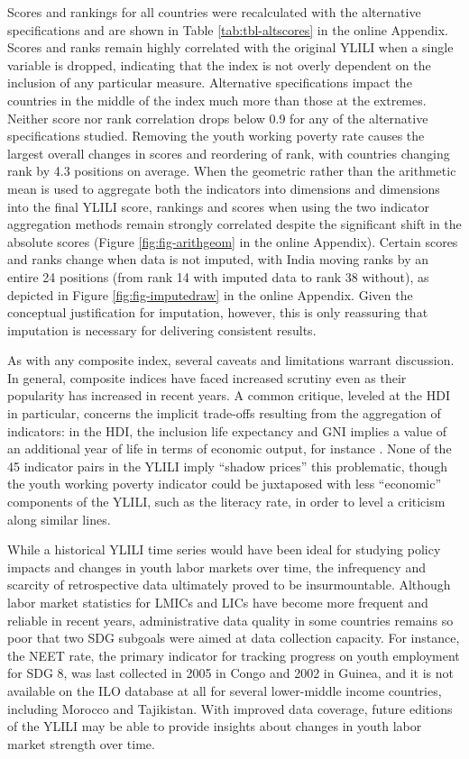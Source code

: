 \documentclass[
  a4paper, twoside, 12pt]{book}
\begin{document}


Scores and rankings for all countries were recalculated with the alternative specifications and are shown in Table \ref{tab:tbl-altscores} in the online Appendix. Scores and ranks remain highly correlated with the original YLILI when a single variable is dropped, indicating that the index is not overly dependent on the inclusion of any particular measure. Alternative specifications impact the countries in the middle of the index much more than those at the extremes. Neither score nor rank correlation drops below 0.9 for any of the alternative specifications studied. Removing the youth working poverty rate causes the largest overall changes in scores and reordering of rank, with countries changing rank by 4.3 positions on average. When the geometric rather than the arithmetic mean is used to aggregate both the indicators into dimensions and dimensions into the final YLILI score, rankings and scores when using the two indicator aggregation methods remain strongly correlated despite the significant shift in the absolute scores (Figure \ref{fig:fig-arithgeom} in the online Appendix). Certain scores and ranks change when data is not imputed, with India moving ranks by an entire 24 positions (from rank 14 with imputed data to rank 38 without), as depicted in Figure \ref{fig:fig-imputedraw} in the online Appendix. Given the conceptual justification for imputation, however, this is only reassuring that imputation is necessary for delivering consistent results.

As with any composite index, several caveats and limitations warrant discussion. In general, composite indices have faced increased scrutiny even as their popularity has increased in recent years. A common critique, leveled at the HDI in particular, concerns the implicit trade-offs resulting from the aggregation of indicators: in the HDI, the inclusion life expectancy and GNI implies a value of an additional year of life in terms of economic output, for instance \autocite{ravallion2012}. None of the 45 indicator pairs in the YLILI imply ``shadow prices'' this problematic, though the youth working poverty indicator could be juxtaposed with less ``economic'' components of the YLILI, such as the literacy rate, in order to level a criticism along similar lines.

While a historical YLILI time series would have been ideal for studying policy impacts and changes in youth labor markets over time, the infrequency and scarcity of retrospective data ultimately proved to be insurmountable. Although labor market statistics for LMICs and LICs have become more frequent and reliable in recent years, administrative data quality in some countries remains so poor that two SDG subgoals were aimed at data collection capacity. For instance, the NEET rate, the primary indicator for tracking progress on youth employment for SDG 8, was last collected in 2005 in Congo and 2002 in Guinea, and it is not available on the ILO database at all for several lower-middle income countries, including Morocco and Tajikistan. With improved data coverage, future editions of the YLILI may be able to provide insights about changes in youth labor market strength over time.
\end{document}
